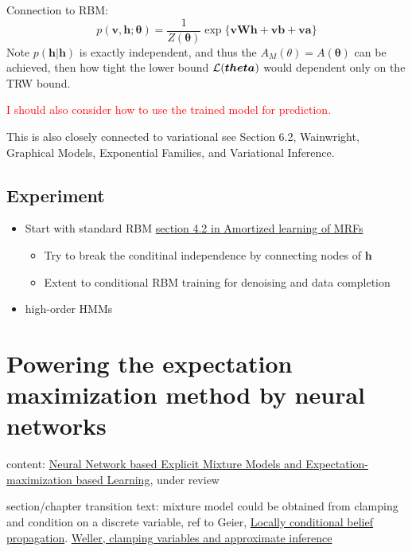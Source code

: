 Connection to RBM:
\begin{equation}
  p(\bm{v}, \bm{h}; \bm{\theta}) = \frac{1}{Z(\bm{\theta})} \exp\{\bm{v}\bm{W}\bm{h} + \bm{v}\bm{b} + \bm{v}\bm{a}\}
\end{equation}
Note $p(\bm{h}|\bm{h})$ is exactly independent, and thus the $A_{M}(\theta) = A(\bm{\theta})$ can be achieved, then how tight the lower bound $\mathcal{L}(\bm{theta})$ would dependent only on the TRW bound.


\textcolor{red}{I should also consider how to use the trained model for prediction.}

This is also closely connected to variational see Section 6.2, Wainwright, Graphical Models, Exponential Families, and Variational Inference.
\section{Experiment}
\begin{itemize}
\item Start with standard RBM \href{https://papers.nips.cc/paper/9687-amortized-bethe-free-energy-minimization-for-learning-mrfs.pdf}{section 4.2 in Amortized learning of MRFs}
  \begin{itemize}
  \item Try to break the conditinal independence by connecting nodes of $\bm{h}$
  \item Extent to conditional RBM training for denoising and data completion
  \end{itemize}
\item high-order HMMs

\end{itemize}




\chapter{Powering the expectation maximization method by neural networks}
content: \href{https://arxiv.org/abs/1907.13432}{Neural Network based Explicit Mixture Models and Expectation-maximization based Learning}, under review

section/chapter transition text: mixture model could be obtained from clamping and condition on a discrete variable, ref to Geier, \href{http://auai.org/uai2015/proceedings/papers/158.pdf}{Locally conditional belief propagation}. \href{https://papers.nips.cc/paper/5529-clamping-variables-and-approximate-inference.pdf}{Weller, clamping variables and approximate inference}


